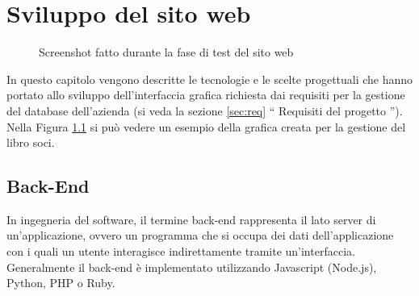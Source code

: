 \documentclass[12pt]{report}
\begin{document}
\chapter{Sviluppo del sito web}
\label{cap3}
%


\begin{figure}[H]
	\caption{Screenshot fatto durante la fase di test del sito web}
	\label{fig:esempio_libro_soci}
\end{figure}

In questo capitolo vengono descritte le tecnologie e le scelte progettuali che hanno portato allo sviluppo dell'interfaccia grafica richiesta dai requisiti per la gestione del database dell'azienda (si veda la sezione \ref{sec:req} \textquotedblleft{} Requisiti del progetto \textquotedblright{}). Nella Figura \ref{fig:esempio_libro_soci} si può vedere un esempio della grafica creata per la gestione del libro soci.

%
\section{Back-End}

In ingegneria del software, il termine back-end rappresenta il lato server di un'applicazione, ovvero un programma che si occupa dei dati dell'applicazione con i quali un utente interagisce indirettamente tramite un'interfaccia. Generalmente il back-end è implementato utilizzando Javascript (Node.js), Python, PHP o Ruby.
\end{document}
